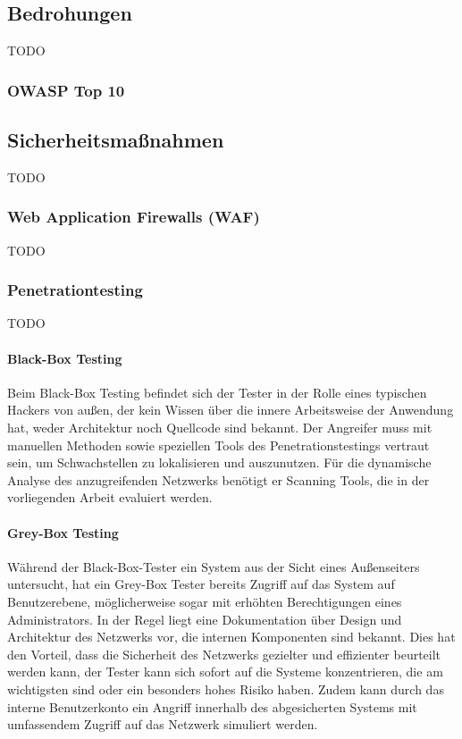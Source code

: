 \documentclass[12pt,oneside,a4paper,parskip]{scrbook}
\begin{document}
    \subsection{Bedrohungen}
    TODO
      \subsubsection{OWASP Top 10}

    \subsection{Sicherheitsmaßnahmen}
    TODO

    \subsubsection{Web Application Firewalls (WAF)}
    TODO

    \subsubsection{Penetrationtesting}
    TODO

    \paragraph{Black-Box Testing}
    Beim Black-Box Testing befindet sich der Tester in der Rolle eines typischen Hackers von
    außen, der kein Wissen über die innere Arbeitsweise der Anwendung hat, weder Architektur noch
    Quellcode sind bekannt. Der Angreifer muss mit manuellen Methoden sowie speziellen Tools des Penetrationstestings vertraut sein, um Schwachstellen zu lokalisieren und auszunutzen. Für die dynamische Analyse des anzugreifenden Netzwerks benötigt er Scanning Tools, die in der vorliegenden Arbeit evaluiert werden.

    \paragraph{Grey-Box Testing}
    Während der Black-Box-Tester ein System aus der Sicht eines Außenseiters untersucht, hat ein    Grey-Box Tester bereits Zugriff auf das System auf Benutzerebene, möglicherweise sogar mit erhöhten Berechtigungen eines Administrators. In der Regel liegt eine Dokumentation über Design und Architektur des Netzwerks vor, die internen Komponenten sind bekannt. Dies hat den Vorteil, dass die Sicherheit des Netzwerks gezielter und effizienter beurteilt werden kann, der Tester kann sich sofort auf die Systeme konzentrieren, die am wichtigsten sind oder ein besonders hohes Risiko haben. Zudem kann durch das interne Benutzerkonto ein Angriff innerhalb des abgesicherten Systems mit umfassendem Zugriff auf das Netzwerk simuliert werden.
\end{document}
